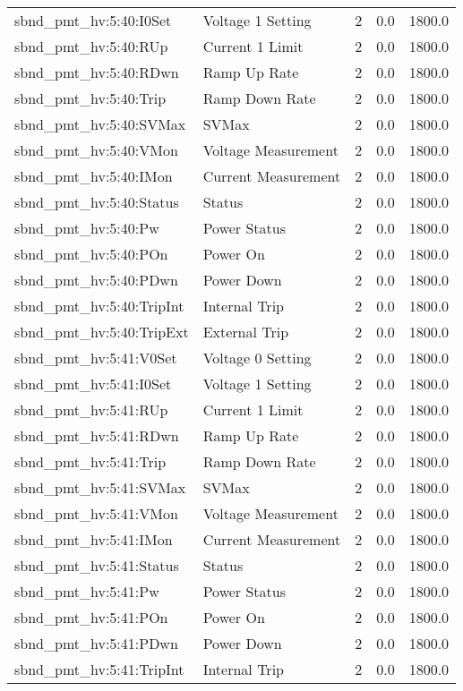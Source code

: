 \begin{center}
\begin{longtable}{l | l l l l }
sbnd\_pmt\_hv:5:40:I0Set & Voltage 1 Setting & 2 & 0.0 & 1800.0\\ 
sbnd\_pmt\_hv:5:40:RUp & Current 1 Limit & 2 & 0.0 & 1800.0\\ 
sbnd\_pmt\_hv:5:40:RDwn & Ramp Up Rate & 2 & 0.0 & 1800.0\\ 
sbnd\_pmt\_hv:5:40:Trip & Ramp Down Rate & 2 & 0.0 & 1800.0\\ 
sbnd\_pmt\_hv:5:40:SVMax & SVMax & 2 & 0.0 & 1800.0\\ 
sbnd\_pmt\_hv:5:40:VMon & Voltage Measurement & 2 & 0.0 & 1800.0\\ 
sbnd\_pmt\_hv:5:40:IMon & Current Measurement & 2 & 0.0 & 1800.0\\ 
sbnd\_pmt\_hv:5:40:Status & Status & 2 & 0.0 & 1800.0\\ 
sbnd\_pmt\_hv:5:40:Pw & Power Status & 2 & 0.0 & 1800.0\\ 
sbnd\_pmt\_hv:5:40:POn & Power On & 2 & 0.0 & 1800.0\\ 
sbnd\_pmt\_hv:5:40:PDwn & Power Down & 2 & 0.0 & 1800.0\\ 
sbnd\_pmt\_hv:5:40:TripInt & Internal Trip & 2 & 0.0 & 1800.0\\ 
sbnd\_pmt\_hv:5:40:TripExt & External Trip & 2 & 0.0 & 1800.0\\ 
sbnd\_pmt\_hv:5:41:V0Set & Voltage 0 Setting & 2 & 0.0 & 1800.0\\ 
sbnd\_pmt\_hv:5:41:I0Set & Voltage 1 Setting & 2 & 0.0 & 1800.0\\ 
sbnd\_pmt\_hv:5:41:RUp & Current 1 Limit & 2 & 0.0 & 1800.0\\ 
sbnd\_pmt\_hv:5:41:RDwn & Ramp Up Rate & 2 & 0.0 & 1800.0\\ 
sbnd\_pmt\_hv:5:41:Trip & Ramp Down Rate & 2 & 0.0 & 1800.0\\ 
sbnd\_pmt\_hv:5:41:SVMax & SVMax & 2 & 0.0 & 1800.0\\ 
sbnd\_pmt\_hv:5:41:VMon & Voltage Measurement & 2 & 0.0 & 1800.0\\ 
sbnd\_pmt\_hv:5:41:IMon & Current Measurement & 2 & 0.0 & 1800.0\\ 
sbnd\_pmt\_hv:5:41:Status & Status & 2 & 0.0 & 1800.0\\ 
sbnd\_pmt\_hv:5:41:Pw & Power Status & 2 & 0.0 & 1800.0\\ 
sbnd\_pmt\_hv:5:41:POn & Power On & 2 & 0.0 & 1800.0\\ 
sbnd\_pmt\_hv:5:41:PDwn & Power Down & 2 & 0.0 & 1800.0\\ 
sbnd\_pmt\_hv:5:41:TripInt & Internal Trip & 2 & 0.0 & 1800.0\\ 

\end{longtable}
\end{center}
